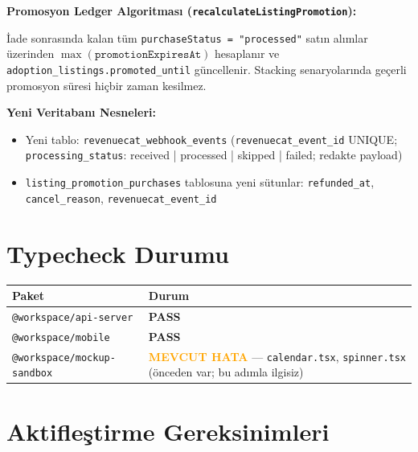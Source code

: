 \documentclass[12pt,a4paper]{article}
\begin{document}
\vspace{0.5em}
\noindent\textbf{Promosyon Ledger Algoritması (\texttt{recalculateListingPromotion}):}

\vspace{0.3em}
\noindent
İade sonrasında kalan tüm \texttt{purchaseStatus = "processed"} satın alımlar üzerinden
$\max(\texttt{promotionExpiresAt})$ hesaplanır ve \texttt{adoption\_listings.promoted\_until}
güncellenir. Stacking senaryolarında geçerli promosyon süresi hiçbir zaman kesilmez.

\vspace{0.5em}
\noindent\textbf{Yeni Veritabanı Nesneleri:}

\begin{itemize}[leftmargin=1.5em]
  \item Yeni tablo: \texttt{revenuecat\_webhook\_events}
        (\texttt{revenuecat\_event\_id} UNIQUE; \texttt{processing\_status}:
        received | processed | skipped | failed; redakte payload)
  \item \texttt{listing\_promotion\_purchases} tablosuna yeni sütunlar:
        \texttt{refunded\_at}, \texttt{cancel\_reason}, \texttt{revenuecat\_event\_id}
\end{itemize}

\section{Typecheck Durumu}

\begin{tabularx}{\textwidth}{lX}
  \toprule
  \textbf{Paket} & \textbf{Durum} \\
  \midrule
  \texttt{@workspace/api-server} & \textcolor{green!60!black}{\textbf{PASS}} \\
  \texttt{@workspace/mobile} & \textcolor{green!60!black}{\textbf{PASS}} \\
  \texttt{@workspace/mockup-sandbox} & \textcolor{orange}{\textbf{MEVCUT HATA}}
    — \texttt{calendar.tsx}, \texttt{spinner.tsx} (önceden var; bu adımla ilgisiz) \\
  \bottomrule
\end{tabularx}

\section{Aktifleştirme Gereksinimleri}
\end{document}
